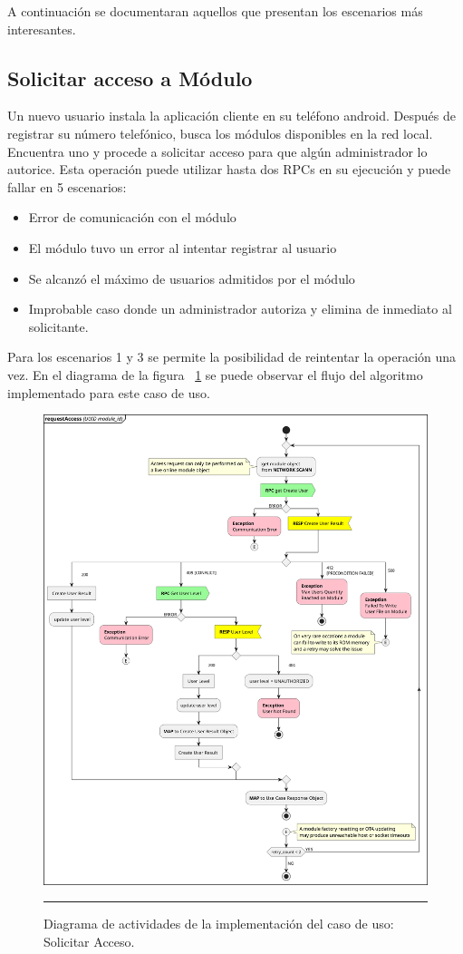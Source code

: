 A continuación se documentaran aquellos que presentan los escenarios más interesantes.

\subsection{Solicitar acceso a Módulo}
Un nuevo usuario instala la aplicación cliente en su teléfono android.
Después de registrar su número telefónico, busca los módulos disponibles en la red local.
Encuentra uno y procede a solicitar acceso para que algún administrador lo autorice.
Esta operación puede utilizar hasta dos RPCs en su ejecución y puede fallar en 5 escenarios:
\begin{itemize}
	\item Error de comunicación con el módulo
	\item El módulo tuvo un error al intentar registrar al usuario
	\item Se alcanzó el máximo de usuarios admitidos por el módulo
	\item Improbable caso donde un administrador autoriza y elimina de inmediato al solicitante.
\end{itemize}
Para los escenarios 1 y 3 se permite la posibilidad de reintentar la operación una vez.
En el diagrama de la figura ~\ref{fig:act_request} se puede observar el flujo del algoritmo implementado para este caso de uso.

\begin{figure}[htbp]
	\centering
	\includegraphics[width=\textwidth]{Figures/iter/ACT_request_ink.png}
	\rule{35em}{1pt}
	\caption[Class Diagram]{Diagrama de actividades de la implementación del caso de uso: Solicitar Acceso.}
	\label{fig:act_request}
\end{figure}


